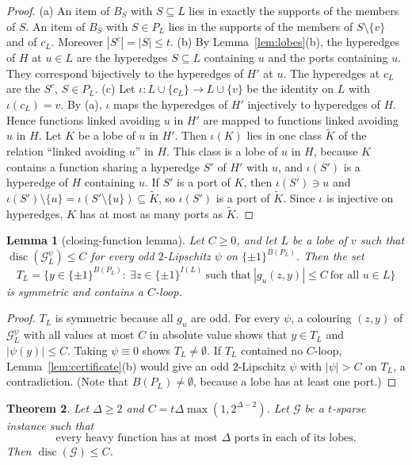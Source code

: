 \documentclass[11pt,letterpaper]{article}
\newtheorem{theorem}{Theorem}[section]
\newtheorem{lemma}[theorem]{Lemma}
\theoremstyle{definition}
\newcommand{\cG}{\mathcal{G}}
\newcommand{\cube}[1]{\{\pm1\}^{#1}}
\DeclareMathOperator{\disc}{disc}
\begin{document}
\begin{proof}
(a) An item of $B_S$ with $S\subseteq L$ lies in exactly the supports of the members of $S$. An
item of $B_S$ with $S\in P_L$ lies in the supports of the members of $S\setminus\{v\}$ and of $c_L$.
Moreover $|S^c|=|S|\le t$.
(b) By Lemma~\ref{lem:lobes}(b), the hyperedges of $H$ at $u\in L$ are the hyperedges $S\subseteq L$
containing $u$ and the ports containing $u$. They correspond bijectively to the hyperedges of $H'$
at $u$. The hyperedges at $c_L$ are the $S^c$, $S\in P_L$.
(c) Let $\iota\colon L\cup\{c_L\}\to L\cup\{v\}$ be the identity on $L$ with $\iota(c_L)=v$. By (a),
$\iota$ maps the hyperedges of $H'$ injectively to hyperedges of $H$. Hence functions linked
avoiding $u$ in $H'$ are mapped to functions linked avoiding $u$ in $H$. Let $K$ be a lobe of $u$
in $H'$. Then $\iota(K)$ lies in one class $\tilde K$ of the relation ``linked avoiding $u$'' in $H$.
This class is a lobe of $u$ in $H$, because $K$ contains a function sharing a hyperedge $S'$ of $H'$
with $u$, and $\iota(S')$ is a hyperedge of $H$ containing $u$. If $S'$ is a port of $K$, then
$\iota(S')\ni u$ and $\iota(S')\setminus\{u\}=\iota(S'\setminus\{u\})\subseteq\tilde K$, so
$\iota(S')$ is a port of $\tilde K$. Since $\iota$ is injective on hyperedges, $K$ has at most as
many ports as $\tilde K$.
\end{proof}

\begin{lemma}[closing-function lemma]\label{lem:closing}
Let $C\ge0$, and let $L$ be a lobe of $v$ such that $\disc(\cG_L^\psi)\le C$ for every odd
$2$-Lipschitz $\psi$ on $\cube{B(P_L)}$. Then the set
\[
  T_L=\bigl\{y\in\cube{B(P_L)}:\ \exists z\in\cube{I(L)}\ \text{such that}\ |g_u(z,y)|\le C\ \text{for all } u\in L\bigr\}
\]
is symmetric and contains a $C$-loop.
\end{lemma}

\begin{proof}
$T_L$ is symmetric because all $g_u$ are odd. For every $\psi$, a colouring $(z,y)$ of
$\cG_L^\psi$ with all values at most $C$ in absolute value shows that $y\in T_L$ and $|\psi(y)|\le
C$. Taking $\psi\equiv0$ shows $T_L\ne\emptyset$. If $T_L$ contained no $C$-loop,
Lemma~\ref{lem:certificate}(b) would give an odd $2$-Lipschitz $\psi$ with $|\psi|>C$ on $T_L$, a
contradiction. (Note that $B(P_L)\ne\emptyset$, because a lobe has at least one port.)
\end{proof}

\begin{theorem}\label{thm:Dinst}
Let $\Delta\ge2$ and $C=t\Delta\max(1,2^{\Delta-2})$. Let $\cG$ be a $t$-sparse instance such that
\begin{equation}\label{eq:star}
  \text{every heavy function has at most $\Delta$ ports in each of its lobes.}\tag{$\star$}
\end{equation}
Then $\disc(\cG)\le C$.
\end{theorem}
\end{document}
